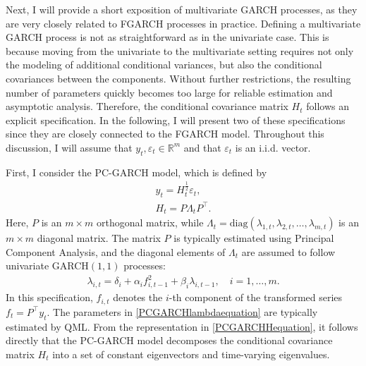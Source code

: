 \documentclass[12pt,a4paper]{article}
\theoremstyle{definition}
\begin{document}
Next, I will provide a short exposition of multivariate GARCH processes, as they are very closely related to FGARCH processes in practice. Defining a multivariate GARCH process is not as straightforward as in the univariate case. This is because moving from the univariate to the multivariate setting requires not only the modeling of additional conditional variances, but also the conditional covariances between the components. Without further restrictions, the resulting number of parameters quickly becomes too large for reliable estimation and asymptotic analysis. Therefore, the conditional covariance matrix $H_t$ follows an explicit specification. In the following, I will present two of these specifications since they are closely connected to the FGARCH model. Throughout this discussion, I will assume that $y_t,\varepsilon_t\in \mathbb{R}^m$ and that $\varepsilon_t$ is an i.i.d. vector.

First, I consider the PC-GARCH model, which is defined by
\begin{gather}
\label{PCGARCHyequation}
    y_t = H_t^{\frac{1}{2}}\varepsilon_t,\\
    \label{PCGARCHHequation}
    H_t = P \Lambda_t P^{\top}.
\end{gather}
Here, $P$ is an $m\times m$ orthogonal matrix, while $\Lambda_t = \mathrm{diag}(\lambda_{1,t},\lambda_{2,t},\ldots,\lambda_{m,t})$ is an $m\times m$ diagonal matrix. The matrix $P$ is typically estimated using Principal Component Analysis, and the diagonal elements of $\Lambda_t$ are assumed to follow univariate GARCH$(1,1)$ processes:
\begin{gather}
\label{PCGARCHlambdaequation}
    \lambda_{i,t} = \delta_i + \alpha_i f_{i,t-1}^{2} + \beta_i \lambda_{i,t-1}, \quad i = 1, \ldots, m.
\end{gather}
In this specification, $f_{i,t}$ denotes the $i$-th component of the transformed series $f_t = P^\top y_t$. The parameters in \cref{PCGARCHlambdaequation} are typically estimated by QML. From the representation in \cref{PCGARCHHequation}, it follows directly that the PC-GARCH model decomposes the conditional covariance matrix $H_t$ into a set of constant eigenvectors and time-varying eigenvalues.
\end{document}
